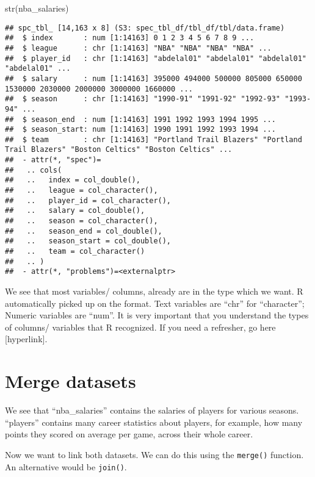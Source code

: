 \documentclass[
]{book}
\newenvironment{Shaded}{\begin{snugshade}}{\end{snugshade}}
\newcommand{\FunctionTok}[1]{\textcolor[rgb]{0.00,0.00,0.00}{#1}}
\newcommand{\NormalTok}[1]{#1}
\begin{document}
\begin{Shaded}
\begin{Highlighting}[]
\FunctionTok{str}\NormalTok{(nba\_salaries)}
\end{Highlighting}
\end{Shaded}

\begin{verbatim}
## spc_tbl_ [14,163 x 8] (S3: spec_tbl_df/tbl_df/tbl/data.frame)
##  $ index       : num [1:14163] 0 1 2 3 4 5 6 7 8 9 ...
##  $ league      : chr [1:14163] "NBA" "NBA" "NBA" "NBA" ...
##  $ player_id   : chr [1:14163] "abdelal01" "abdelal01" "abdelal01" "abdelal01" ...
##  $ salary      : num [1:14163] 395000 494000 500000 805000 650000 1530000 2030000 2000000 3000000 1660000 ...
##  $ season      : chr [1:14163] "1990-91" "1991-92" "1992-93" "1993-94" ...
##  $ season_end  : num [1:14163] 1991 1992 1993 1994 1995 ...
##  $ season_start: num [1:14163] 1990 1991 1992 1993 1994 ...
##  $ team        : chr [1:14163] "Portland Trail Blazers" "Portland Trail Blazers" "Boston Celtics" "Boston Celtics" ...
##  - attr(*, "spec")=
##   .. cols(
##   ..   index = col_double(),
##   ..   league = col_character(),
##   ..   player_id = col_character(),
##   ..   salary = col_double(),
##   ..   season = col_character(),
##   ..   season_end = col_double(),
##   ..   season_start = col_double(),
##   ..   team = col_character()
##   .. )
##  - attr(*, "problems")=<externalptr>
\end{verbatim}

We see that most variables/ columns, already are in the type which we want. R automatically picked up on the format. Text variables are ``chr'' for ``character''; Numeric variables are ``num''. It is very important that you understand the types of columns/ variables that R recognized. If you need a refresher, go here {[}hyperlink{]}.

\hypertarget{merge-datasets}{%
\section{Merge datasets}\label{merge-datasets}}

We see that ``nba\_salaries'' contains the salaries of players for various seasons.
``players'' contains many career statistics about players, for example, how many points they scored on average per game, across their whole career.

Now we want to link both datasets. We can do this using the \texttt{merge()} function.
An alternative would be \texttt{join()}.
\end{document}
